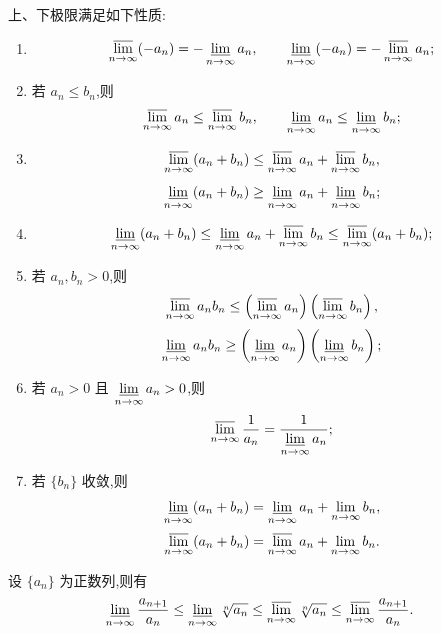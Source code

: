 \documentclass[../数学分析培优讲义.tex]{subfiles}
\begin{document}
\begin{theorem}[\markstar]
上、下极限满足如下性质:
\begin{enumerate}[label=(\arabic*)]
  \item
  \[
  \varlimsup\limits_{n\to\infty}(-a_n)=-\varliminf\limits_{n\to\infty}a_n,
  \qquad
  \varliminf\limits_{n\to\infty}(-a_n)=-\varlimsup\limits_{n\to\infty}a_n;
  \]
  \item 若 $a_n\leq b_n$,则
  \[
  \varlimsup\limits_{n\to\infty}a_n\leq\varlimsup\limits_{n\to\infty}b_n,
  \qquad
  \varliminf\limits_{n\to\infty}a_n\leq\varliminf\limits_{n\to\infty}b_n;
  \]
  \item
  \[
  \varlimsup\limits_{n\to\infty}(a_n+b_n)
  \leq
  \varlimsup\limits_{n\to\infty}a_n+
  \varlimsup\limits_{n\to\infty}b_n,
  \]
  \[
  \varliminf\limits_{n\to\infty}(a_n+b_n)
  \geq
  \varliminf\limits_{n\to\infty}a_n+
  \varliminf\limits_{n\to\infty}b_n;
  \]
  \item
  \[
  \varliminf\limits_{n\to\infty}(a_n+b_n)
  \leq
  \varliminf\limits_{n\to\infty}a_n+
  \varlimsup\limits_{n\to\infty}b_n
  \leq
  \varlimsup\limits_{n\to\infty}(a_n+b_n);
  \]
  \item 若 $a_n,b_n>0$,则
  \[
  \varlimsup\limits_{n\to\infty}a_nb_n
  \leq
  \left(\varlimsup\limits_{n\to\infty}a_n\right)
  \left(\varlimsup\limits_{n\to\infty}b_n\right),
  \]
  \[
  \varliminf\limits_{n\to\infty}a_nb_n
  \geq
  \left(\varliminf\limits_{n\to\infty}a_n\right)
  \left(\varliminf\limits_{n\to\infty}b_n\right);
  \]
  \item 若 $a_n>0$ 且 $\displaystyle \varliminf\limits_{n\to\infty}a_n>0$,则
  \[
  \varlimsup\limits_{n\to\infty}\dfrac{1}{a_n}
  =
  \dfrac{1}{\displaystyle \varliminf\limits_{n\to\infty}a_n};
  \]
  \item 若 $\{b_n\}$ 收敛,则
  \[
  \varliminf\limits_{n\to\infty}(a_n+b_n)
  =
  \varliminf\limits_{n\to\infty}a_n+\lim\limits_{n\to\infty}b_n,
  \]
  \[
  \varlimsup\limits_{n\to\infty}(a_n+b_n)
  =
  \varlimsup\limits_{n\to\infty}a_n+\lim\limits_{n\to\infty}b_n.
  \]
\end{enumerate}
\end{theorem}

\begin{proposition}[\markstar]
设 $\{a_n\}$ 为正数列,则有
\[
\varliminf\limits_{n\to\infty}\dfrac{a_{n+1}}{a_n}
\leq
\varliminf\limits_{n\to\infty}\sqrt[n]{a_n}
\leq
\varlimsup\limits_{n\to\infty}\sqrt[n]{a_n}
\leq
\varlimsup\limits_{n\to\infty}\dfrac{a_{n+1}}{a_n}.
\]
\end{proposition}
\end{document}
